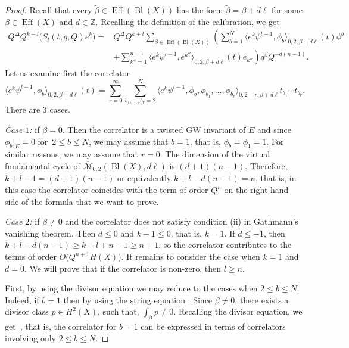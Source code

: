 \documentclass[10pt,a4paper]{article}
\numberwithin{equation}{section}
\newcommand{\ZZ}{\mathbb{Z}}
\begin{document}
\begin{proof}
Recall that every $\widetilde{\beta}\in \operatorname{Eff}(\operatorname{Bl}(X))$
has the form $\widetilde{\beta}=\beta + d\ell$ for some
$\beta \in \operatorname{Eff}(X)$ and $d\in \ZZ$. Recalling the
definition of the calibration, we get
\begin{align*}
Q^\Delta Q^{k+l} \big(S_l(t,q,Q) e^k\big) ={}&
Q^\Delta Q^{k+l}
\sum_{\widetilde{\beta}\in
\operatorname{Eff}(\operatorname{Bl}(X)) }
\left(
\sum_{b=1}^N
\big\langle e^k \psi^{l-1},\phi_b\big\rangle_{0,2,\beta+d\ell}(t)
\phi^b\right.\\
&\left. +
\sum_{k''=1}^{n-1}
\big\langle e^k \psi^{l-1}, e^{k''}\big\rangle_{0,2,\beta+d\ell}(t)
e_{k''} \right) q^\beta Q^{-d (n-1)}.
\end{align*}
Let us examine first the correlator
\[
\big\langle e^k \psi^{l-1},\phi_b\big\rangle_{0,2,\beta+d\ell}(t) =
\sum_{r=0}^\infty \sum_{b_1,\dots,b_r=2}^N
\big\langle e^k \psi^{l-1},\phi_b,\phi_{b_1},\dots,\phi_{b_r}
\big\rangle_{0,2+r,\beta+d\ell}
t_{b_1}\cdots t_{b_r}.
\]
There are 3 cases.

{\em Case $1$:} if $\beta=0$. Then the correlator is a twisted GW
invariant of $E$ and since $\phi_b|_E=0$ for~$2\leq b\leq N$, we may
assume that $b=1$, that is, $\phi_b=\phi_1=1$. For similar reasons, we
may assume that $r=0$. The dimension of the
virtual fundamental cycle of
$\overline{\mathcal{M}}_{0,2}(\operatorname{Bl}(X),d\ell)$ is
$(d+1)(n-1)$. Therefore, $k+l-1=(d+1)(n-1)$ or equivalently
$k+l-d(n-1)=n$, that is, in this case the correlator coincides with
the term of order $Q^n$ on the right-hand side of the formula that we want to prove.

{\em Case $2$:} if $\beta\neq 0$ and the correlator does not satisfy
condition (ii) in Gathmann's vanishing theorem. Then $d\leq 0$ and
$k-1\leq 0$, that is, $k=1$. If $d\leq -1$, then
$k+l-d(n-1)\geq k+l+n-1\geq n+1$, so the correlator contributes to the
terms of order $O\big(Q^{n+1}H(X)\big)$. It remains to consider the case when $k=1$ and $d=0$. We will prove that if the correlator  is non-zero, then $l\geq n$.

First, by using the divisor equation we may reduce to the cases when $2\leq b\leq N$. Indeed, if $b=1$ then by using the string equation
. Since $\beta\neq 0$, there exists a divisor class $p\in H^2(X)$, such that, $\int_\beta p\neq 0$. Recalling the divisor equation, we get~, that is, the correlator for $b=1$ can be expressed in terms of correlators involving only $2\leq b\leq N$.


\end{proof}
\end{document}
